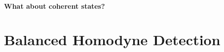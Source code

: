 \documentclass[../../note.tex]{subfiles}
\begin{document}
\textbf{What about coherent states?}

\section{Balanced Homodyne Detection}






\end{document}
